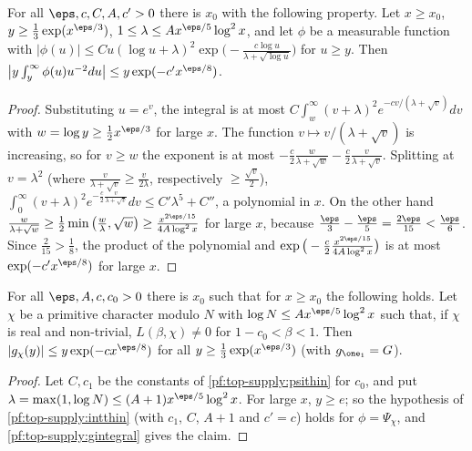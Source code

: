 \begin{lemma}\label{pf:top-supply:intthin}
For all $\eps,c,C,A,c'>0$ there is $x_0$ with the following property. Let $x\ge x_0$, $y\ge\frac13\exp(x^{\eps/3})$,
$1\le\lambda\le Ax^{\eps/5}\log^2x$, and let $\phi$ be a measurable function with
$|\phi(u)|\le Cu(\log u+\lambda)^2\exp\big(-\frac{c\log u}{\lambda+\sqrt{\log u}}\big)$ for $u\ge y$. Then
$\big|y\int_y^\infty\phi(u)u^{-2}du\big|\le y\exp(-c'x^{\eps/8})$.
\end{lemma}

\begin{proof}
Substituting $u=e^v$, the integral is at most $C\int_{w}^\infty(v+\lambda)^2e^{-cv/(\lambda+\sqrt v)}dv$ with
$w=\log y\ge\frac12x^{\eps/3}$ for large $x$. The function $v\mapsto v/(\lambda+\sqrt v)$ is increasing, so for $v\ge w$
the exponent is at most $-\frac c2\frac w{\lambda+\sqrt w}-\frac c2\frac v{\lambda+\sqrt v}$. Splitting at $v=\lambda^2$
(where $\frac v{\lambda+\sqrt v}\ge\frac v{2\lambda}$, respectively $\ge\frac{\sqrt v}2$),
$\int_0^\infty(v+\lambda)^2e^{-\frac c2\frac v{\lambda+\sqrt v}}dv\le C'\lambda^5+C''$, a polynomial in $x$. On the other hand
$\frac w{\lambda+\sqrt w}\ge\frac12\min\big(\frac w\lambda,\sqrt w\big)\ge\frac{x^{2\eps/15}}{4A\log^2x}$ for large $x$,
because $\frac\eps3-\frac\eps5=\frac{2\eps}{15}<\frac\eps6$. Since $\frac2{15}>\frac18$, the product of the polynomial and
$\exp\big(-\frac c2\frac{x^{2\eps/15}}{4A\log^2x}\big)$ is at most $\exp(-c'x^{\eps/8})$ for large $x$.
\end{proof}

\begin{lemma}\label{pf:top-supply:thin}
For all $\eps,A,c,c_0>0$ there is $x_0$ such that for $x\ge x_0$ the following holds. Let $\chi$ be a primitive character
modulo $N$ with $\log N\le Ax^{\eps/5}\log^2x$ such that, if $\chi$ is real and non-trivial, $L(\beta,\chi)\ne0$ for
$1-c_0<\beta<1$. Then $|g_\chi(y)|\le y\exp(-cx^{\eps/8})$ for all $y\ge\frac13\exp(x^{\eps/3})$ (with $g_{\one_1}=G$).
\end{lemma}

\begin{proof}
Let $C,c_1$ be the constants of \cref{pf:top-supply:psithin} for $c_0$, and put $\lambda=\max(1,\log N)\le(A+1)x^{\eps/5}\log^2x$.
For large $x$, $y\ge e$; so the hypothesis of \cref{pf:top-supply:intthin} (with $c_1$, $C$, $A+1$ and $c'=c$) holds for
$\phi=\Psi_\chi$, and \cref{pf:top-supply:gintegral} gives the claim.
\end{proof}


